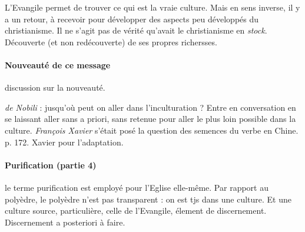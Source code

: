 \begin{Prop}
    L'Evangile permet de trouver ce qui est la vraie culture.
    Mais en sens inverse, il y a un retour, à recevoir pour développer des aspects peu développés du christianisme. Il ne s'agit pas de vérité qu'avait le christianisme en \textit{stock}. Découverte (et non redécouverte) de ses propres richersses. 
\end{Prop}

\paragraph{Nouveauté de ce message} discussion sur la nouveauté. 

\textit{de Nobili} : jusqu'où peut on aller dans l'inculturation ? Entre en conversation en se laissant aller sans a priori, sans retenue pour aller le plus loin possible dans la culture.
\textit{François Xavier} s'était posé la question des semences du verbe en Chine. p. 172. Xavier pour l'adaptation. 

\paragraph{Purification (partie 4)} le terme purification est employé pour l'Eglise elle-même.  Par rapport au polyèdre, le polyèdre n'est pas transparent : on est tjs dans une culture. Et une culture source, particulière, celle de l'Evangile, élement de discernement.
Discernement a posteriori à faire.




